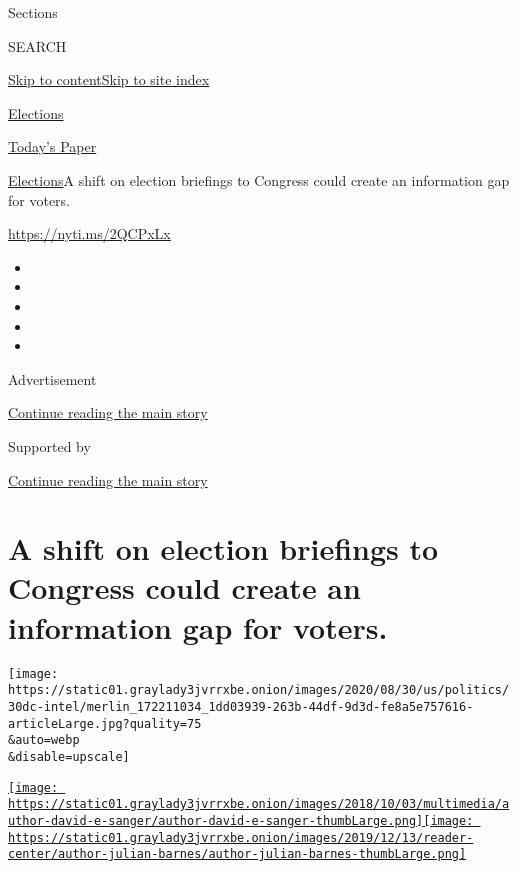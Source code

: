 Sections

SEARCH

\protect\hyperlink{site-content}{Skip to
content}\protect\hyperlink{site-index}{Skip to site index}

\href{https://www.nytimes3xbfgragh.onion/news-event/2020-election}{Elections}

\href{https://myaccount.nytimes3xbfgragh.onion/auth/login?response_type=cookie\&client_id=vi}{}

\href{https://www.nytimes3xbfgragh.onion/section/todayspaper}{Today's
Paper}

\href{/news-event/2020-election}{Elections}\textbar{}A shift on election
briefings to Congress could create an information gap for voters.

\url{https://nyti.ms/2QCPxLx}

\begin{itemize}
\item
\item
\item
\item
\item
\end{itemize}

Advertisement

\protect\hyperlink{after-top}{Continue reading the main story}

Supported by

\protect\hyperlink{after-sponsor}{Continue reading the main story}

\hypertarget{a-shift-on-election-briefings-to-congress-could-create-an-information-gap-for-voters}{%
\section{A shift on election briefings to Congress could create an
information gap for
voters.}\label{a-shift-on-election-briefings-to-congress-could-create-an-information-gap-for-voters}}

\texttt{[image: https://static01.graylady3jvrrxbe.onion/images/2020/08/30/us/politics/30dc-intel/merlin\_172211034\_1dd03939-263b-44df-9d3d-fe8a5e757616-articleLarge.jpg?quality=75\\\&auto=webp\\\&disable=upscale]}

\href{https://www.nytimes3xbfgragh.onion/by/david-e-sanger}{\texttt{[image: https://static01.graylady3jvrrxbe.onion/images/2018/10/03/multimedia/author-david-e-sanger/author-david-e-sanger-thumbLarge.png]}}\href{https://www.nytimes3xbfgragh.onion/by/julian-e-barnes}{\texttt{[image: https://static01.graylady3jvrrxbe.onion/images/2019/12/13/reader-center/author-julian-barnes/author-julian-barnes-thumbLarge.png]}}

